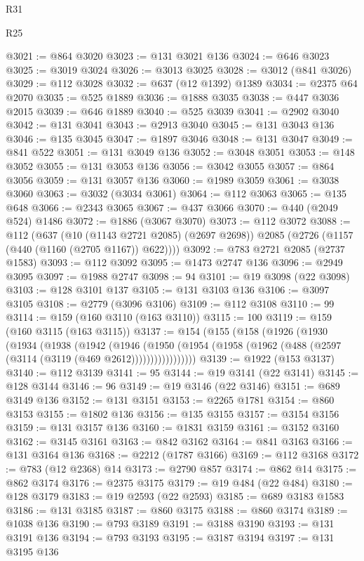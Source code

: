 \begin{lexlean}{R31}
\begin{lexlean}{R25}
\begin{coremodule}
{{{{{{{{{{{{{{{{{{{{{{{{{{{{{{{{{{{{{{{{{{{{{{{{{{{{{{{{{{{{{{{{{{{{{{{{{{{{{{{{{{{{{{{{{{{{{{{{{{{{{{{{{{{{{{{{{{{{{{{{{{{{{{{{{{{{{{{{{{{{{{{{{{{{{{{{{{{{{{{{{{{{{{{{{{{{{{{{{{{{{{{{{{{{{{{{{{{{{{{@3021 := @864 @3020
@3023 := @131 @3021 @136
@3024 := @646 @3023
@3025 := @3019 @3024
@3026 := @3013 @3025
@3028 := @3012 (@841 @3026)
@3029 := @112 @3028
@3032 := @637 (@12 @1392) @1389
@3034 := @2375 @64 @2070
@3035 := @525 @1889
@3036 := @1888 @3035
@3038 := @447 @3036 @2015
@3039 := @646 @1889
@3040 := @525 @3039
@3041 := @2902 @3040
@3042 := @131 @3041
@3043 := @2913 @3040
@3045 := @131 @3043 @136
@3046 := @135 @3045
@3047 := @1897 @3046
@3048 := @131 @3047
@3049 := @841 @522
@3051 := @131 @3049 @136
@3052 := @3048 @3051
@3053 := @148 @3052
@3055 := @131 @3053 @136
@3056 := @3042 @3055
@3057 := @864 @3056
@3059 := @131 @3057 @136
@3060 := @1989 @3059
@3061 := @3038 @3060
@3063 := @3032 (@3034 @3061)
@3064 := @112 @3063
@3065 := @135 @648
@3066 := @2343 @3065
@3067 := @437 @3066
@3070 := @440 (@2049 @524) @1486
@3072 := @1886 (@3067 @3070)
@3073 := @112 @3072
@3088 := @112
    (@637
      (@10 (@1143 @2721 @2085) (@2697 @2698))
      @2085
      (@2726 (@1157 (@440 (@1160 (@2705 @1167)) @622))))
@3092 := @783 @2721 @2085 (@2737 @1583)
@3093 := @112 @3092
@3095 := @1473 @2747 @136
@3096 := @2949 @3095
@3097 := @1988 @2747
@3098 := 94
@3101 := @19 @3098 (@22 @3098)
@3103 := @128 @3101 @137
@3105 := @131 @3103 @136
@3106 := @3097 @3105
@3108 := @2779 (@3096 @3106)
@3109 := @112 @3108
@3110 := 99
@3114 := @159 (@160 @3110 (@163 @3110))
@3115 := 100
@3119 := @159 (@160 @3115 (@163 @3115))
@3137 := @154
    (@155
      (@158
        (@1926
          (@1930
            (@1934
              (@1938
                (@1942
                  (@1946
                    (@1950
                      (@1954 (@1958 (@1962 (@488 (@2597 (@3114 (@3119 (@469 @2612)))))))))))))))))
@3139 := @1922 (@153 @3137)
@3140 := @112 @3139
@3141 := 95
@3144 := @19 @3141 (@22 @3141)
@3145 := @128 @3144
@3146 := 96
@3149 := @19 @3146 (@22 @3146)
@3151 := @689 @3149 @136
@3152 := @131 @3151
@3153 := @2265 @1781
@3154 := @860 @3153
@3155 := @1802 @136
@3156 := @135 @3155
@3157 := @3154 @3156
@3159 := @131 @3157 @136
@3160 := @1831 @3159
@3161 := @3152 @3160
@3162 := @3145 @3161
@3163 := @842 @3162
@3164 := @841 @3163
@3166 := @131 @3164 @136
@3168 := @2212 (@1787 @3166)
@3169 := @112 @3168
@3172 := @783 (@12 @2368) @14
@3173 := @2790 @857
@3174 := @862 @14
@3175 := @862 @3174
@3176 := @2375 @3175
@3179 := @19 @484 (@22 @484)
@3180 := @128 @3179
@3183 := @19 @2593 (@22 @2593)
@3185 := @689 @3183 @1583
@3186 := @131 @3185
@3187 := @860 @3175
@3188 := @860 @3174
@3189 := @1038 @136
@3190 := @793 @3189
@3191 := @3188 @3190
@3193 := @131 @3191 @136
@3194 := @793 @3193
@3195 := @3187 @3194
@3197 := @131 @3195 @136
}}}}}}}}}}}}}}}}}}}}}}}}}}}}}}}}}}}}}}}}}}}}}}}}}}}}}}}}}}}}}}}}}}}}}}}}}}}}}}}}}}}}}}}}}}}}}}}}}}}}}}}}}}}}}}}}}}}}}}}}}}}}}}}}}}}}}}}}}}}}}}}}}}}}}}}}}}}}}}}}}}}}}}}}}}}}}}}}}}}}}}}}}}}}}}}}}}}}}}}
\end{coremodule}
\end{lexlean}
\end{lexlean}
